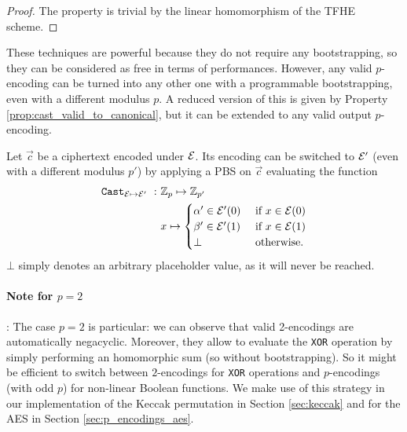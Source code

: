 \begin{proof}
    The property is trivial by the linear homomorphism of the TFHE scheme.
\end{proof} 

These techniques are powerful because they do not require any bootstrapping, so they can be considered as free in terms of performances. However, any valid $p$-encoding can be turned into any other one with a programmable bootstrapping, even with a different modulus $p$. A reduced version of this is given by Property \ref{prop:cast_valid_to_canonical}, but it can be extended to any valid output $p$-encoding.

\begin{property} 
    Let $\vec c$ be a ciphertext encoded under $\mathcal{E}$. Its encoding can be switched to $\mathcal{E}'$ (even with a different modulus $p'$) by applying a PBS on $\vec c$ evaluating the function     \begin{align}
        \texttt{Cast}_{\mathcal{E} \mapsto \mathcal{E}'}~:~& \mathbb{Z}_p \mapsto \mathbb{Z}_{p'}\\
        & x \mapsto \begin{cases}
                        \alpha' \in \mathcal{E}'(0) & \text{ if } x \in \mathcal{E}(0)\\
                        \beta' \in \mathcal{E}'(1) & \text{ if } x \in \mathcal{E}(1)\\
                        \bot & \text{ otherwise.}
                    \end{cases}
    \end{align}
    $\bot$ simply denotes an arbitrary placeholder value, as it will never be reached.
    \label{prop:enc_switch_pbs}
\end{property} 


\paragraph{Note for $p = 2$}: The case $p = 2$ is particular: we can observe that valid 2-encodings are automatically negacyclic. Moreover, they allow to evaluate the \texttt{XOR} operation by simply performing an homomorphic sum (so without bootstrapping). So it might be efficient to switch between $2$-encodings for \texttt{XOR} operations and $p$-encodings (with odd $p$) for non-linear Boolean functions. We make use
of this strategy in our implementation of the Keccak permutation in Section \ref{sec:keccak} and for
the AES in Section \ref{sec:p_encodings_aes}.



